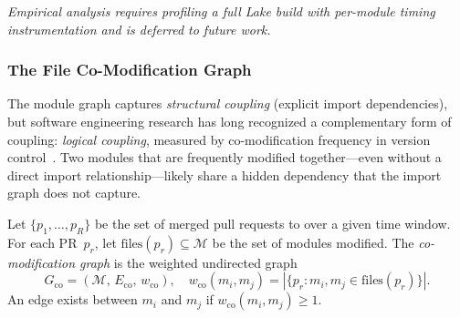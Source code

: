 \emph{Empirical analysis requires profiling a full Lake build with per-module timing instrumentation and is deferred to future work.}

\subsubsection{The File Co-Modification Graph}
\label{sec:co-edit-graph}

The module graph captures \emph{structural coupling} (explicit import dependencies), but software engineering research has long recognized a complementary form of coupling: \emph{logical coupling}, measured by co-modification frequency in version control~\cite{decan2019}. Two modules that are frequently modified together---even without a direct import relationship---likely share a hidden dependency that the import graph does not capture.

\begin{definition}\label{def:co-edit-graph}
Let $\{p_1, \ldots, p_R\}$ be the set of merged pull requests to  over a given time window. For each PR~$p_r$, let $\mathrm{files}(p_r) \subseteq \mathcal{M}$ be the set of modules modified. The \emph{co-modification graph} is the weighted undirected graph
\[
  G_{\mathrm{co}} = (\mathcal{M},\, E_{\mathrm{co}},\, w_{\mathrm{co}}), \quad w_{\mathrm{co}}(m_i, m_j) = |\{p_r : m_i, m_j \in \mathrm{files}(p_r)\}|.
\]
An edge exists between $m_i$ and $m_j$ if $w_{\mathrm{co}}(m_i, m_j) \ge 1$.
\end{definition}

